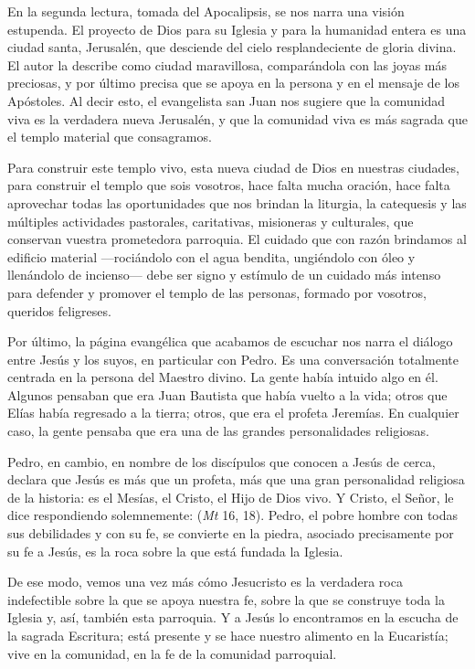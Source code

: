 En la segunda lectura, tomada del Apocalipsis, se nos narra una visión estupenda. El proyecto de Dios para su Iglesia y para la humanidad entera es una ciudad santa, Jerusalén, que desciende del cielo resplandeciente de gloria divina. El autor la describe como ciudad maravillosa, comparándola con las joyas más preciosas, y por último precisa que se apoya en la persona y en el mensaje de los Apóstoles. Al decir esto, el evangelista san Juan nos sugiere que la comunidad viva es la verdadera nueva Jerusalén, y que la comunidad viva es más sagrada que el templo material que consagramos.

Para construir este templo vivo, esta nueva ciudad de Dios en nuestras ciudades, para construir el templo que sois vosotros, hace falta mucha oración, hace falta aprovechar todas las oportunidades que nos brindan la liturgia, la catequesis y las múltiples actividades pastorales, caritativas, misioneras y culturales, que conservan  vuestra prometedora parroquia. El cuidado que con razón brindamos al edificio material ---rociándolo con el agua bendita, ungiéndolo con óleo y llenándolo de incienso--- debe ser signo y estímulo de un cuidado más intenso para defender y promover el templo de las personas, formado por vosotros, queridos feligreses.

Por último, la página evangélica que acabamos de escuchar nos narra el diálogo entre Jesús y los suyos, en particular con Pedro. Es una conversación totalmente centrada en la persona del Maestro divino. La gente había intuido algo en él. Algunos pensaban que era Juan Bautista que había vuelto a la vida; otros que Elías había regresado a la tierra; otros, que era el profeta Jeremías. En cualquier caso, la gente pensaba que era una de las grandes personalidades religiosas.

Pedro, en cambio, en nombre de los discípulos que conocen a Jesús de cerca, declara que Jesús es más que un profeta, más que una gran personalidad religiosa de la historia: es el Mesías, el Cristo, el Hijo de Dios vivo. Y Cristo, el Señor, le dice respondiendo solemnemente:  (\emph{Mt} 16, 18). Pedro, el pobre hombre con todas sus debilidades y con su fe, se convierte en la piedra, asociado precisamente por su fe a Jesús, es la roca sobre la que está fundada la Iglesia.

De ese modo, vemos una vez más cómo Jesucristo es la verdadera roca indefectible sobre la que se apoya nuestra fe, sobre la que se construye toda la Iglesia y, así, también esta parroquia. Y a Jesús lo encontramos en la escucha de la sagrada Escritura; está presente y se hace nuestro alimento en la Eucaristía; vive en la comunidad, en la fe de la comunidad parroquial.

